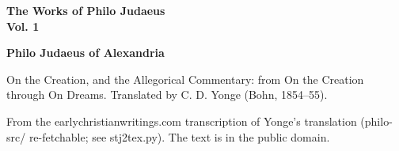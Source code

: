 \documentclass[11pt,letterpaper]{article}
\begin{document}
\color{ink}

\begin{titlepage}
\centering
\vspace*{4em}
{\LARGE\bfseries\color{heading} The Works of Philo Judaeus\\[0.3em]Vol. 1\par}
\vspace{2em}
{\Large\bfseries\color{heading} Philo Judaeus of Alexandria\par}
\vspace{2.5em}
{\itshape\color{subhead}\parbox{0.8\linewidth}{\centering On the Creation, and the Allegorical Commentary: from On the Creation through On Dreams. Translated by C. D. Yonge (Bohn, 1854--55).\par}}
\vfill
{\small From the earlychristianwritings.com transcription of Yonge's translation (philo-src/ re-fetchable; see stj2tex.py). The text is in the public domain.\par}
\vspace{2em}
\end{titlepage}

\tableofcontents


\end{document}
